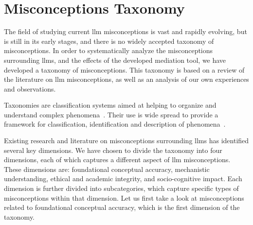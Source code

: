 \chapter{Misconceptions Taxonomy}\label{taxonomy}
The field of studying current \gls{llm} misconceptions is vast and rapidly evolving, but is still in its early stages, and there is no widely accepted taxonomy of misconceptions. 
In order to systematically analyze the misconceptions surrounding \gls{llms}, and the effects of the developed mediation tool, we have developed a taxonomy of misconceptions. 
This taxonomy is based on a review of the literature on \gls{llm} misconceptions, as well as an analysis of our own experiences and observations. 

Taxonomies are classification systems aimed at helping to organize and understand complex phenomena~\cite{kundisch_update_2022}. 
Their use is wide spread to provide a framework for classification, identification and description of phenomena~\cite{schoormann_exploring_2022}.

Existing research and literature on misconceptions surrounding \gls{llms} has identified several key dimensions. We have chosen to divide the taxonomy into four dimensions, each of which captures a different aspect of \gls{llm} misconceptions. These dimensions are: foundational conceptual accuracy, mechanistic understanding, ethical and academic integrity, and socio-cognitive impact. Each dimension is further divided into subcategories, which capture specific types of misconceptions within that dimension. Let us first take a look at misconceptions related to foundational conceptual accuracy, which is the first dimension of the taxonomy.

